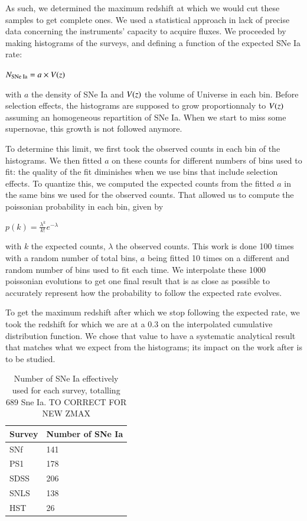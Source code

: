 \documentclass{aa}
\def\l{\lambda}\def\L{\Lambda}
\begin{document}
As such, we determined the maximum redshift at which we would cut these samples
to get complete ones. We used a statistical approach in lack of precise data
concerning the instruments' capacity to acquire fluxes. We proceeded by making
histograms of the surveys, and defining a function of the expected SNe Ia rate:
\begin{center}
    $ \displaystyle N_{\text{SNe Ia}} = a \times V(z)$
\end{center}
with $a$ the density of SNe Ia and $V(z)$ the volume of Universe in each bin.
Before selection effects, the histograms are supposed to grow proportionnaly to
$V(z)$ assuming an homogeneous repartition of SNe Ia. When we start to miss some
supernovae, this growth is not followed anymore.

To determine this limit, we first took the observed counts in each bin of the
histograms. We then fitted $a$ on these counts for different numbers of bins
used to fit: the quality of the fit diminishes when we use bins that include
selection effects. To quantize this, we computed the expected counts from the
fitted $a$ in the same bins we used for the observed counts. That allowed us to
compute the poissonian probability in each bin, given by
\begin{center}
    $ \displaystyle p(k) = \frac{\l^k}{k!}e^{-\l}$
\end{center}
with $k$ the expected counts, $\l$ the observed counts. This work is done 100
times with a random number of total bins, $a$ being fitted 10 times on a
different and random number of bins used to fit each time. We interpolate these
1000 poissonian evolutions to get one final result that is as close as possible
to accurately represent how the probability to follow the expected rate evolves.

To get the maximum redshift after which we stop following the expected rate, we
took the redshift for which we are at a 0.3 on the interpolated cumulative
distribution function. We chose that value to have a systematic analytical
result that matches what we expect from the histograms; its impact on the work
after is to be studied.

\begin{table}[htbp!]
    \centering
    \caption{Number of SNe Ia effectively used for each survey, totalling 689
    Sne Ia. TO CORRECT FOR NEW ZMAX}
    \label{tab:sample}
    \begin{tabularx}{\linewidth}{|Y*{1}{|Y}|}\hline
         Survey & Number of SNe Ia \\\hline\hline
        SNf & 141 \\\hline
        PS1 & 178 \\\hline
        SDSS & 206 \\\hline
        SNLS & 138 \\\hline
        HST & 26 \\\hline
    \end{tabularx}
\end{table}
\end{document}
